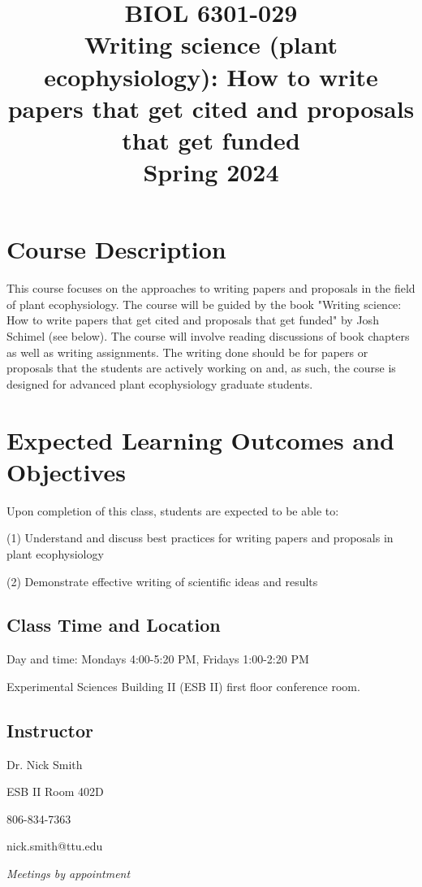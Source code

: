 \documentclass[12pt, notitlepage]{article}   	%
\title{
	\textbf{
		BIOL 6301-029
	} \\
	\large Writing science (plant ecophysiology): How to write papers that get cited and
	proposals that get funded \\
	\large Spring 2024
}
\date{\vspace{-5ex}}
\begin{document}
{\selectfont %

\maketitle

\section{Course Description}
This course focuses on the approaches to writing papers and proposals in the field
of plant ecophysiology. The course will be guided by the book "Writing science: 
How to write papers that get cited and proposals that get funded" by Josh Schimel (see
below). The course will involve reading discussions of book chapters as well as writing assignments.
The writing done should be for papers or proposals that the students are actively working on and,
as such, the course is designed for advanced plant ecophysiology graduate students.

\section{Expected Learning Outcomes and Objectives}
Upon completion of this class, students are expected to be able to:\par
(1)	Understand and discuss best practices for writing papers and proposals in plant ecophysiology\par
(2) Demonstrate effective writing of scientific ideas and results\par

\subsection{Class Time and Location}
Day and time: Mondays 4:00-5:20 PM, Fridays 1:00-2:20 PM

Experimental Sciences Building II (ESB II) first floor conference room.

\subsection{Instructor}
Dr. Nick Smith \par
ESB II Room 402D \par
806-834-7363 \par
nick.smith@ttu.edu \par
\textit{Meetings by appointment}

}
\end{document}
